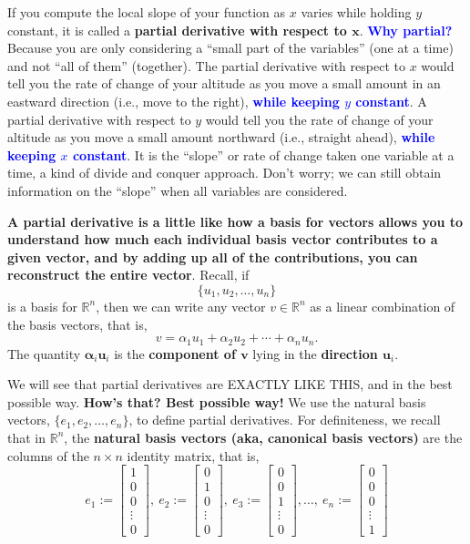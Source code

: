 If you compute the local slope of your function as \(x\) varies while holding \(y\) constant, it is called a \textbf{partial derivative with respect to \(\bm{x}\)}. \textcolor{blue}{\bf Why partial?} Because you are only considering a ``small part of the variables'' (one at a time) and not ``all of them'' (together). The partial derivative with respect to \(x\) would tell you the rate of change of your altitude as you move a small amount in an eastward direction (i.e., move to the right), \textcolor{blue}{\bf while keeping \(y\) constant}. A partial derivative with respect to \(y\) would tell you the rate of change of your altitude as you move a small amount northward (i.e., straight ahead), \textcolor{blue}{\bf while keeping \(x\) constant}. It is the ``slope'' or rate of change taken one variable at a time, a kind of divide and conquer approach. Don't worry; we can still obtain information on the ``slope'' when all variables are considered.

\textbf{A partial derivative is a little like how a basis for vectors allows you to understand how much each individual basis vector contributes to a given vector, and by adding up all of the contributions, you can reconstruct the entire vector}. Recall, if
\[
\{u_1, u_2, \ldots, u_n\}
\]
is a basis for \(\mathbb{R}^{n}\), then we can write any vector \(v \in \mathbb{R}^{n}\) as a linear combination of the basis vectors, that is,
\[
v = \alpha_1 u_1 + \alpha_2 u_2 + \cdots + \alpha_n u_n.
\]
The quantity \(\bm \alpha_i \bm u_i\) is the \textbf{component of \(\bm v\)} lying in the \textbf{direction \(\bm u_i\)}.

We will see that partial derivatives are EXACTLY LIKE THIS, and in the best possible way. \textbf{How's that? Best possible way!} We use the natural basis vectors, \(\{e_1, e_2, \ldots, e_n\}\), to define partial derivatives. For definiteness, we recall that in \(\mathbb{R}^{n}\), the \textbf{natural basis vectors (aka, canonical basis vectors)} are the columns of the \(n \times n\) identity matrix, that is,
\[
e_1:= \left[ \begin{array}{c} 1 \\ 0 \\ 0 \\ \vdots \\ 0 \end{array}\right], ~e_2:= \left[ \begin{array}{c} 0 \\ 1 \\ 0 \\ \vdots \\ 0 \end{array}\right], ~e_3:= \left[ \begin{array}{c} 0 \\ 0 \\ 1 \\ \vdots \\ 0 \end{array}\right], \ldots, ~e_n:= \left[ \begin{array}{c} 0 \\ 0 \\ 0 \\ \vdots \\ 1 \end{array}\right]
\]

